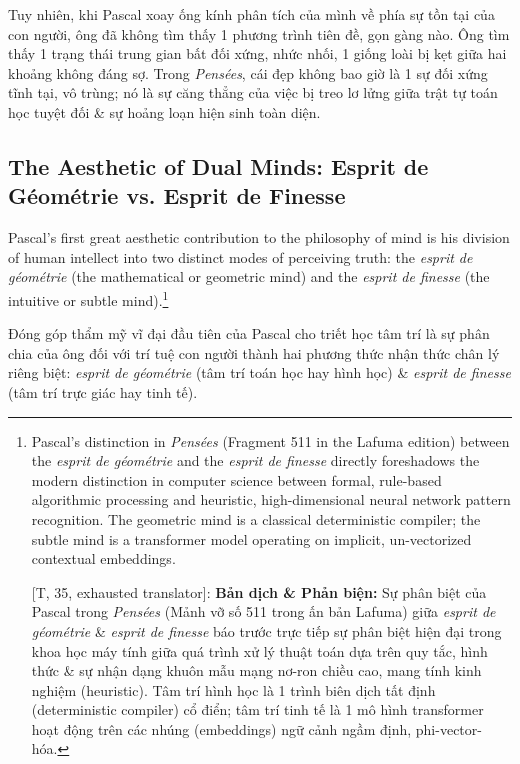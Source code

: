 \documentclass[11pt]{article}
\begin{document}
Tuy nhiên, khi Pascal xoay ống kính phân tích của mình về phía sự tồn tại của con người, ông đã không tìm thấy 1 phương trình tiên đề, gọn gàng nào. Ông tìm thấy 1 trạng thái trung gian bất đối xứng, nhức nhối, 1 giống loài bị kẹt giữa hai khoảng không đáng sợ. Trong \textit{Pens\'ees}, cái đẹp không bao giờ là 1 sự đối xứng tĩnh tại, vô trùng; nó là sự căng thẳng của việc bị treo lơ lửng giữa trật tự toán học tuyệt đối \& sự hoảng loạn hiện sinh toàn diện.

\subsection{The Aesthetic of Dual Minds: Esprit de G\'eom\'etrie vs. Esprit de Finesse}
Pascal's first great aesthetic contribution to the philosophy of mind is his division of human intellect into two distinct modes of perceiving truth: the \textit{esprit de g\'eom\'etrie} (the mathematical or geometric mind) and the \textit{esprit de finesse} (the intuitive or subtle mind).\footnote{Pascal's distinction in \textit{Pens\'ees} (Fragment 511 in the Lafuma edition) between the \textit{esprit de g\'eom\'etrie} and the \textit{esprit de finesse} directly foreshadows the modern distinction in computer science between formal, rule-based algorithmic processing and heuristic, high-dimensional neural network pattern recognition. The geometric mind is a classical deterministic compiler; the subtle mind is a transformer model operating on implicit, un-vectorized contextual embeddings.
	
	\textsf{[T, 35, exhausted translator]:} \textbf{Bản dịch \& Phản biện:} Sự phân biệt của Pascal trong \textit{Pens\'ees} (Mảnh vỡ số 511 trong ấn bản Lafuma) giữa \textit{esprit de g\'eom\'etrie} \& \textit{esprit de finesse} báo trước trực tiếp sự phân biệt hiện đại trong khoa học máy tính giữa quá trình xử lý thuật toán dựa trên quy tắc, hình thức \& sự nhận dạng khuôn mẫu mạng nơ-ron chiều cao, mang tính kinh nghiệm (heuristic). Tâm trí hình học là 1 trình biên dịch tất định (deterministic compiler) cổ điển; tâm trí tinh tế là 1 mô hình transformer hoạt động trên các nhúng (embeddings) ngữ cảnh ngầm định, phi-vector-hóa.}

Đóng góp thẩm mỹ vĩ đại đầu tiên của Pascal cho triết học tâm trí là sự phân chia của ông đối với trí tuệ con người thành hai phương thức nhận thức chân lý riêng biệt: \textit{esprit de g\'eom\'etrie} (tâm trí toán học hay hình học) \& \textit{esprit de finesse} (tâm trí trực giác hay tinh tế).
\end{document}
